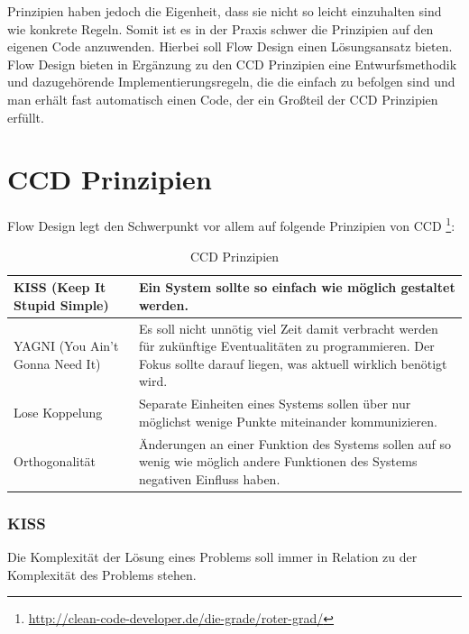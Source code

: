 Prinzipien haben jedoch die Eigenheit, dass sie nicht so leicht einzuhalten sind wie konkrete Regeln.
Somit ist es in der Praxis schwer die Prinzipien auf den eigenen Code anzuwenden.
Hierbei soll Flow Design einen Lösungsansatz bieten. Flow Design bieten in
Ergänzung zu den CCD Prinzipien eine Entwurfsmethodik und dazugehörende Implementierungsregeln, die
die einfach zu befolgen sind und man erhält fast automatisch einen Code, der ein Großteil der CCD Prinzipien erfüllt.

\section{CCD Prinzipien}

Flow Design legt den Schwerpunkt vor allem auf folgende Prinzipien von CCD \footnote{\url{http://clean-code-developer.de/die-grade/roter-grad/}}:

\bigskip



\begin{table}[H]
	\centering
	\begin{tabular}{ | p{5cm} | p{9.5cm} | } 
	\hline
	KISS \linebreak (Keep It Stupid Simple)  & Ein System sollte so einfach wie möglich gestaltet werden. \\
	\hline
	YAGNI  \linebreak (You Ain't Gonna Need It) & Es soll nicht unnötig viel Zeit damit verbracht werden für zukünftige Eventualitäten zu programmieren. 
	Der Fokus sollte darauf liegen, was aktuell wirklich benötigt wird. \\
	\hline
	Lose Koppelung & Separate Einheiten eines Systems sollen über nur möglichst  wenige Punkte miteinander kommunizieren. \\
	\hline
	Orthogonalität & Änderungen an einer Funktion des Systems sollen auf so wenig wie möglich andere Funktionen des Systems negativen Einfluss haben. \\
	\hline
	\end{tabular}
	\medskip
	\caption{CCD Prinzipien}
\end{table}

\subsubsection{KISS}

Die Komplexität der Lösung eines Problems soll immer in Relation zu der
Komplexität des Problems stehen.

